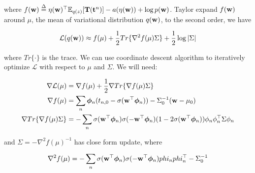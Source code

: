 where $f(\mathbf{w}) \stackrel{\Delta}{=} \eta(\mathbf{w})^{\top} \mathbb{E}_{q(z)}
[\mathbf{T}(\mathbf{t}^n)] - a(\eta(\mathbf{w})) + \log p(\mathbf{w})$. Taylor expand $f(\mathbf{w})$ 
around $\mu$, the mean of variational distribution $q(\mathbf{w})$, to the second order,
we have 

\begin{equation}
\mathcal{L}(q(\mathbf{w})) \approx f(\mu) + \frac{1}{2} Tr\{\nabla^2 f(\mu)\Sigma\} 
+ \frac{1}{2} \log |\Sigma|
\end{equation}

where $Tr\{\cdot\}$ is the trace. We can use coordinate descent algorithm to
iteratively optimize $\mathcal{L}$ with respect to $\mu$ and $\Sigma$. We will
need:

\begin{align}
\nabla \mathcal{L}(\mu) &= \nabla f(\mu) + \frac{1}{2}\nabla Tr\{\nabla f(\mu) 
\Sigma\}
\\
\nabla f(\mu) &= \sum_n \bm{\phi}_n (t_{n,0} - \sigma(\mathbf{w}^{\top} \bm{\phi}_n)) - 
\Sigma_0^{-1} (\mathbf{w} - \mu_0)
\\
\nabla Tr\{\nabla f(\mu)  \Sigma\} &= -\sum_n \sigma(\mathbf{w}^{\top}\bm{\phi}_n)
\sigma(-\mathbf{w}^{\top}\bm{\phi}_n) (1-2\sigma(\mathbf{w}^{\top}\bm{\phi}_n)) \phi_n \phi_n^{\top} \Sigma \phi_n
\end{align}

and $\Sigma = -\nabla^2 f(\mu)^{-1}$ has close form update, where 

\begin{equation}
\nabla^2 f(\mu) = -\sum_n \sigma(\mathbf{w}^{\top}\bm{\phi}_n)\sigma(-\mathbf{w}^{\top}\bm{\phi}_n) phi_n phi_n^{\top}
- \Sigma_0^{-1}
\end{equation}
